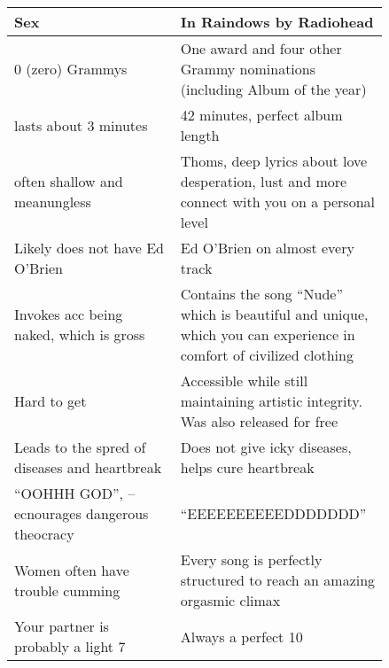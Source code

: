 \begin{table}[ht]
    \centering
    \begin{tabular}{p{0.42\linewidth}|p{0.42\linewidth}}
        \textbf{Sex} & \textbf{In Raindows} by \textbf{Radiohead} \\
        \hline
        $0$ (zero) Grammys & One award and four other Grammy nominations (including Album of the year) \\[2mm]
        lasts about 3 minutes & 42 minutes, perfect album length \\[2mm]
        often shallow and meanungless & Thoms, deep lyrics about love desperation, lust and more connect with you on a personal level \\[2mm]
        Likely does not have Ed O'Brien & Ed O'Brien on almost every track \\[2mm]
        Invokes acc being naked, which is gross & Contains the song ``Nude'' which is beautiful and unique, which you can experience in comfort of civilized clothing \\[2mm]
        Hard to get & Accessible while still maintaining artistic integrity. Was also released for free \\[2mm]
        Leads to the spred of diseases and heartbreak & Does not give icky diseases, helps cure heartbreak \\[2mm]
        ``OOHHH GOD'', -- ecnourages dangerous theocracy & ``EEEEEEEEEEDDDDDDD'' \\[2mm]
        Women often have trouble cumming & Every song is perfectly structured to reach an amazing orgasmic climax \\[2mm]
        Your partner is probably a light 7 & Always a perfect 10
    \end{tabular}
    \label{tab:sex}
\end{table}

